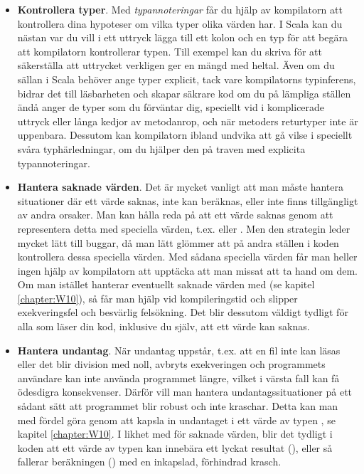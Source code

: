 \begin{itemize}
\item \textbf{Kontrollera typer}. Med \textit{typannoteringar} får du hjälp av kompilatorn att kontrollera dina hypoteser om vilka typer olika värden har. I Scala kan du nästan var du vill i ett uttryck lägga till ett kolon och en typ för att begära att kompilatorn kontrollerar typen. Till exempel kan du skriva  för att säkerställa att uttrycket  verkligen ger en mängd med heltal. Även om du sällan i Scala behöver ange typer explicit, tack vare kompilatorns typinferens, bidrar det till läsbarheten och skapar säkrare kod om du på lämpliga ställen ändå anger de typer som du förväntar dig, speciellt vid i komplicerade uttryck eller långa kedjor av metodanrop, och när metoders returtyper inte är uppenbara. Dessutom kan kompilatorn ibland undvika att gå vilse i speciellt svåra typhärledningar, om du hjälper den på traven med explicita typannoteringar.

\item \textbf{Hantera saknade värden}. Det är mycket vanligt att man måste hantera situationer där ett värde saknas, inte kan beräknas, eller inte finns tillgängligt av andra orsaker. Man kan hålla reda på att ett värde saknas genom att representera detta med speciella värden, t.ex.  eller . Men den strategin leder mycket lätt till buggar, då man lätt glömmer att på andra ställen i koden kontrollera dessa speciella värden. Med sådana speciella värden får man heller ingen hjälp av kompilatorn att upptäcka att man missat att ta hand om dem. Om man istället hanterar eventuellt saknade värden med  (se kapitel \ref{chapter:W10}), så får man hjälp vid kompileringstid och slipper exekveringsfel och besvärlig felsökning. Det blir dessutom väldigt tydligt för alla som läser din kod, inklusive du själv, att ett värde kan saknas.
 
\item \textbf{Hantera undantag}. När undantag uppstår, t.ex. att en fil inte kan läsas eller det blir division med noll, avbryts exekveringen och programmets användare kan inte använda programmet längre, vilket i värsta fall kan få ödesdigra konsekvenser. Därför vill man hantera undantagssituationer på ett sådant sätt att programmet blir robust och inte kraschar. Detta kan man med fördel göra genom att kapsla in undantaget i ett värde av typen , se kapitel \ref{chapter:W10}. I likhet med  för saknade värden, blir det tydligt i koden att ett värde av typen  kan innebära ett lyckat resultat (), eller så fallerar beräkningen () med en inkapslad, förhindrad krasch. 


\end{itemize}
